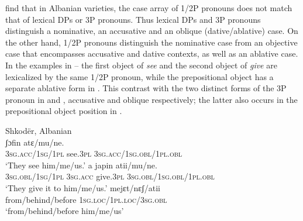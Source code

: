 \documentclass[output=paper,colorlinks,citecolor=brown,nonflat]{./langscibook}
\begin{document}
\citet{ManziniSavoia2014} find that in Albanian varieties, the case array of 1/2P pronouns does not match that of lexical DPs or 3P pronouns. Thus lexical DPs and 3P pronouns distinguish a nominative, an accusative and an oblique (dative/ablative) case. On the other hand, 1/2P pronouns distinguish the nominative case from an objective case that encompasses accusative and dative contexts, as well as an ablative case. In the examples in -- the first object of \textit{see} and the second object of \textit{give} are lexicalized by the same 1/2P pronoun, while the prepositional object has a separate ablative form in . This contrast with the two distinct forms of the 3P pronoun in  and , accusative and oblique respectively; the latter also occurs in the prepositional object position in .

\ea%
    \label{ex:manzini:10}
    Shkodër, Albanian \citep{ManziniSavoia2014}\\
    \ea\label{ex:manzini:10a}
          {ʃɔfin}    {atɛ/mu/ne}.\\
        \textsc{3sg.acc/1sg/1pl}    see.\textsc{3pl} \textsc{3sg.acc/1sg.obl/1pl.obl}\\
    \glt ‘They see him/me/us.’
    \ex\label{ex:manzini:10b}
           {a}   {japin}    {atii/mu/ne}.\\
        \textsc{3sg.obl/1sg/1pl} \textsc{3sg.acc} give.\textsc{3pl}  \textsc{3sg.obl/1sg.obl/1pl.obl}\\
    \glt ‘They give it to him/me/us.’
    \ex\label{ex:manzini:10c}
         {mejɛt/nɛʃ/atii}\\
        from/behind/before \textsc{1sg.loc/1pl.loc/3sg.obl}\\
    \glt ‘from/behind/before him/me/us’
    \z
\z
\end{document}
